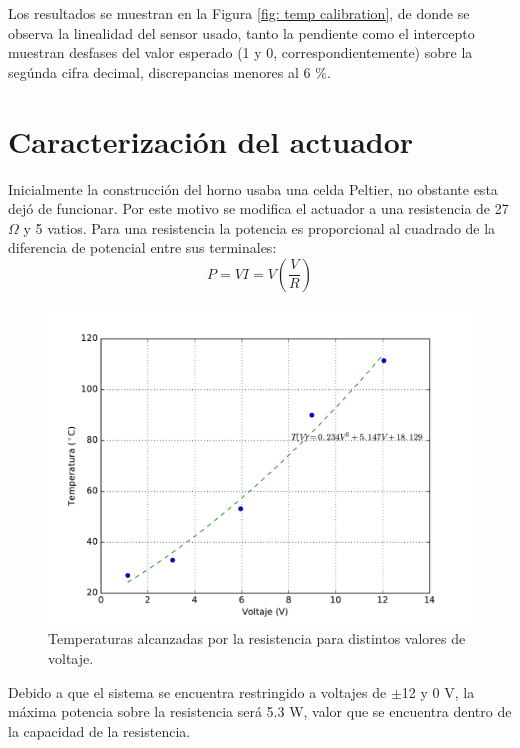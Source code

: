 \documentclass{wileysix}
\begin{document}
Los resultados se muestran en la Figura \ref{fig: temp calibration}, de donde se observa la linealidad del sensor usado, tanto la pendiente como el intercepto muestran desfases del valor esperado (1 y 0, correspondientemente) sobre la seg\'unda cifra decimal, discrepancias menores al 6 \%.

\section{Caracterizaci\'on del actuador}
Inicialmente la construcci\'on del horno usaba una celda Peltier, no obstante esta dej\'o de funcionar. Por este motivo se modifica el actuador a una resistencia de 27 $\Omega$ y 5 vatios. Para una resistencia la potencia es proporcional al cuadrado de la diferencia de potencial entre sus terminales:
\begin{equation}
	P = VI = V\left(\frac{V}{R}\right)
\end{equation}

\begin{figure}[h]
	\centering
	\includegraphics[width=0.6\linewidth]{extras/actuator.pdf}
	\caption{Temperaturas alcanzadas por la resistencia para distintos valores de voltaje.}
\end{figure}
Debido a que el sistema se encuentra restringido a voltajes de $\pm$12 y 0 V, la m\'axima potencia sobre la resistencia ser\'a 5.3 W, valor que se encuentra dentro de la capacidad de la resistencia.
\end{document}
